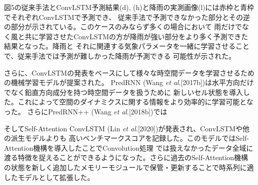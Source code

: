図5の従来手法とConvLSTM予測結果(d), (h)と降雨の実測画像(l)には赤枠と青枠でそれぞれConvLSTMで予測でき、
従来手法で予測できなかった部分とその逆の部分が示されている。このケースのみならず多くの場合において
雨だけでなく風と共に学習させたConvLSTMの方が降雨が強い部分をより多く予測できた結果となった。降雨と
それに関連する気象パラメータを一緒に学習させることで、従来手法では予測が難しかった降雨が予測できる
可能性が示された。

さらに、ConvLSTMの発表をベースにして様々な時空間データを学習させるための機械学習モデルが提案された。
PredRNN (Wang \textit{et al}.[2017b])は水平方向だけでなく鉛直方向成分を持つ時空間データを扱うために
新しいセル状態を導入した。これによって空間のダイナミクスに関する情報をより効率的に学習可能となった。
さらにPredRNN++ (Wang \textit{et al}.[2018b])では



そしてSelf-Attention ConvLSTM (Lin \textit{et al}.[2020])が発表され、ConvLSTMや他の派生モデルよりも
高いベンチマークスコアを記録した。このモデルではSelf-Attention機構を導入したことでConvolution処理
では扱えなかったデータ全域に渡る特徴を捉えることができるようになった。さらに過去のSelf-Attention機構
の状態を新しく追加したメモリーモジュールで保管・更新することで時系列に適したモデルとして拡張した。


